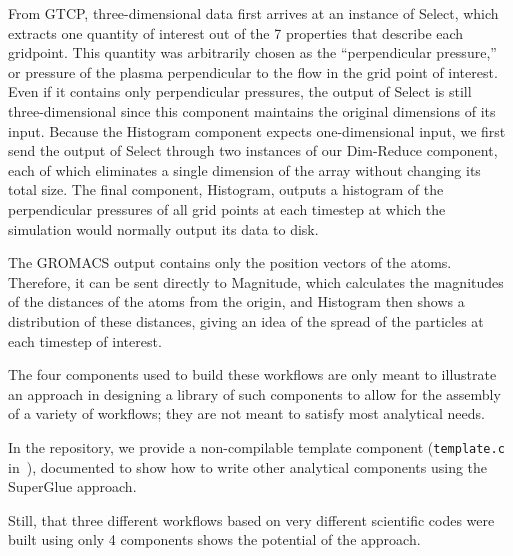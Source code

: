 From GTCP, three-dimensional data first
arrives at an instance of Select, which extracts
one quantity of interest out of the 7 properties that describe each gridpoint.
This quantity was arbitrarily chosen as the ``perpendicular
pressure,'' or pressure of the plasma perpendicular to the flow in the grid
point of interest. Even if it contains only perpendicular pressures, the output
of Select is still three-dimensional since this component maintains the
original dimensions of its input. Because the Histogram component expects
one-dimensional input, we first send the output of Select through two instances
of our Dim-Reduce component, each of which eliminates a single dimension of the
array without changing its total size. The final component, Histogram, outputs
a histogram of the perpendicular pressures of all grid points at each timestep
at which the simulation would normally output its data to disk.

The GROMACS output
contains only the
position vectors
of the atoms.
Therefore, it can be sent directly to
Magnitude, which calculates
the magnitudes of the distances of the atoms from
the origin, and Histogram then shows a distribution
of these distances, giving an idea of the spread
of the particles at each timestep of interest.

The four components used to build these workflows
are only meant to illustrate an approach
in designing a library of such components
to allow for the assembly of a variety of workflows;
they are not meant to satisfy most analytical needs.

In the repository, we provide a non-compilable
template component
(\verb|template.c| in~\cite{champsaur:superglue-repo}),
documented to show
how to write other analytical
components using the SuperGlue approach.

Still, that three different workflows based
on very different scientific codes were built using
only 4 components shows the potential of the approach.
